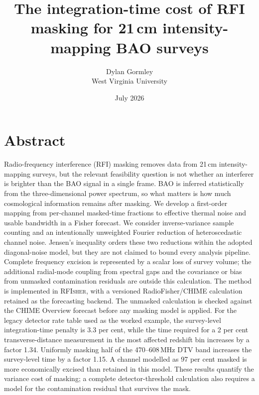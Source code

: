 \documentclass[10pt,twocolumn]{article}
\title{The integration-time cost of RFI masking for 21\,cm
intensity-mapping BAO surveys}
\author{Dylan Gormley \\ {\small West Virginia University}}
\date{July 2026}
\begin{document}
\maketitle

\section*{Abstract}

Radio-frequency interference (RFI) masking removes data from 21\,cm
intensity-mapping surveys, but the relevant feasibility question is not
whether an interferer is brighter than the BAO signal in a single frame.
BAO is inferred statistically from the three-dimensional power spectrum,
so what matters is how much cosmological information remains after
masking. We develop a first-order mapping from per-channel masked-time
fractions to effective thermal noise and usable bandwidth in a Fisher
forecast. We consider inverse-variance sample counting and an
intentionally unweighted Fourier reduction of heteroscedastic channel
noise. Jensen's inequality orders these two reductions within the
adopted diagonal-noise model, but they are not claimed to bound every
analysis pipeline. Complete frequency excision is represented by a
scalar loss of survey volume; the additional radial-mode coupling from
spectral gaps and the covariance or bias from unmasked contamination residuals are
outside this calculation. The method is implemented in
\textsc{RFIsher}, with a versioned RadioFisher/CHIME
calculation retained as the forecasting backend. The unmasked
calculation is checked against the CHIME Overview forecast before any
masking model is applied. For the legacy detector rate table used as the
worked example, the survey-level integration-time penalty is
3.3 per cent, while the time required for a 2 per cent
transverse-distance measurement in the most affected redshift bin
increases by a factor 1.34. Uniformly masking half of the
470--608\,MHz DTV band increases the survey-level time by a factor
1.15. A channel modelled as 97 per cent masked is more economically
excised than retained in this model. These results quantify the
variance cost of masking; a complete detector-threshold calculation also
requires a model for the contamination residual that survives the mask.





\end{document}
